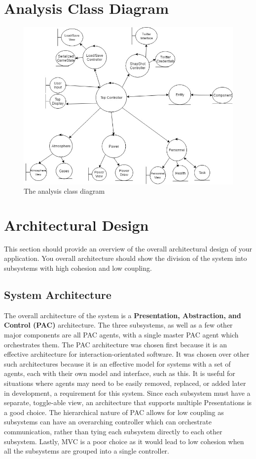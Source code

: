\documentclass[]{article}
\begin{document}
\section{Analysis Class Diagram}
\label{sec:analysis_class_diagram}
\begin{figure}[H]
	\centering
	\includegraphics[width=120mm]{ACD_primitives.jpg}
	\caption{The analysis class diagram}
\end{figure}


\section{Architectural Design}
\label{sec:architectural_design}
This section should provide an overview of the overall architectural design of your application. You overall architecture should show the division of the system into subsystems with high cohesion and low coupling.

\subsection{System Architecture}
\label{sub:system_architecture}
The overall architecture of the system is a \textbf{Presentation, Abstraction, and Control (PAC)} architecture. The three subsystems, as well as a few other major components are all PAC agents, with a single master PAC agent which orchestrates them. The PAC architecture was chosen first because it is an effective architecture for interaction-orientated software. It was chosen over other such architectures because it is an effective model for systems with a set of agents, each with their own model and interface, such as this. It is useful for situations where agents may need to be easily removed, replaced, or added later in development, a requirement for this system. Since each subsystem must have a separate, toggle-able view, an architecture that supports multiple Presentations is a good choice. The hierarchical nature of PAC allows for low coupling as subsystems can have an overarching controller which can orchestrate communication, rather than tying each subsystem directly to each other subsystem. Lastly, MVC is a poor choice as it would lead to low cohesion when all the subsystems are grouped into a single controller.
\end{document}
